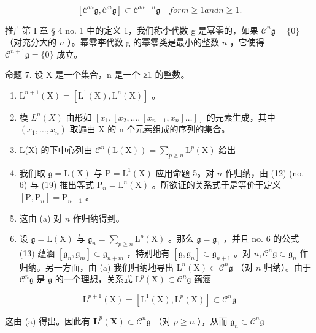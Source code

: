 \[
[ \mathcal {C} ^ {m} \mathfrak {g}, \mathcal {C} ^ {n} \mathfrak {g} ] \subset \mathcal {C} ^ {m + n} \mathfrak {g} \quad for m \geqslant 1 and n \geqslant 1.
\]

推广第 I 章 § 4 no. 1 中的定义 1，我们称李代数 g 是幂零的，如果 \(\mathcal{C}^{n}\mathfrak{g} = \{0\}\) （对充分大的 \(n\) ）。幂零李代数 g 的幂零类是最小的整数 \(n\) ，它使得 \(\mathcal{C}^{n + 1}\mathfrak{g} = \{0\}\) 成立。

命题 7. 设 X 是一个集合，n 是一个 ≥1 的整数。

\begin{enumerate}
\def\labelenumi{(\alph{enumi})}
\item
  \(\mathrm{L}^{n+1}(\mathrm{X}) = [\mathrm{L}^{1}(\mathrm{X}), \mathrm{L}^{n}(\mathrm{X})]\) 。
\item
  模 \(L^{n}(X)\) 由形如 \([x_{1}, [x_{2}, \ldots, [x_{n-1}, x_{n}] \ldots]]\) 的元素生成，其中 \((x_{1}, \ldots, x_{n})\) 取遍由 X 的 n 个元素组成的序列的集合。
\item
  L(X) 的下中心列由 \(\mathcal{C}^n (\mathrm{L}(\mathrm{X})) = \sum_{p\geqslant n}\mathrm{L}^p (\mathrm{X})\) 给出
\item
  我们取 \(\mathfrak{g} = \mathrm{L}(\mathrm{X})\) 与 \(\mathrm{P} = \mathrm{L}^{1}(\mathrm{X})\) 应用命题 5。对 \(n\) 作归纳，由 (12) (no. 6) 与 (19) 推出等式 \(\mathrm{P}_{n} = \mathrm{L}^{n}(\mathrm{X})\) 。所欲证的关系式于是等价于定义 \([\mathrm{P}, \mathrm{P}_{n}] = \mathrm{P}_{n + 1}\) 。
\item
  这由 (a) 对 \(n\) 作归纳得到。
\item
  设 \(\mathfrak{g} = \mathrm{L}(\mathrm{X})\) 与 \(\mathfrak{g}_{n} = \sum_{p\geqslant n}\mathrm{L}^{p}(\mathrm{X})\) 。那么 \(\mathfrak{g} = \mathfrak{g}_1\) ，并且 no. 6 的公式 (13) 蕴涵 \([\mathfrak{g}_{n},\mathfrak{g}_{m}]\subset \mathfrak{g}_{n + m}\) ，特别地有 \([\mathfrak{g},\mathfrak{g}_n]\subset \mathfrak{g}_{n + 1}\) 。对 \(n,\mathcal{C}^{n}\mathfrak{g}\subset \mathfrak{g}_{n}\) 作归纳。另一方面，由 (a) 我们归纳地导出 \(\mathrm{L}^{n}(\mathrm{X})\subset \mathcal{C}^{n}\mathfrak{g}\) （对 \(n\) 归纳）。由于 \(\mathcal{C}^{n}\mathfrak{g}\) 是 \(\mathfrak{g}\) 的一个理想，关系式 \(\mathrm{L}^p (\mathrm{X})\subset \mathcal{C}^{n}\mathfrak{g}\) 蕴涵
\end{enumerate}

\[
\mathrm{L} ^ {p + 1} (\mathrm{X}) = [ \mathrm{L} ^ {1} (\mathrm{X}), \mathrm{L} ^ {p} (\mathrm{X}) ] \subset \mathcal {C} ^ {n} \mathfrak {g}
\]

这由 (a) 得出。因此有 \(\mathbf{L}^p (\mathbf{X})\subset \mathcal{C}^{n}\mathfrak{g}\) （对 \(p\geqslant n\) ），从而 \(\mathfrak{g}_n\subset \mathcal{C}^{n}\mathfrak{g}\)

